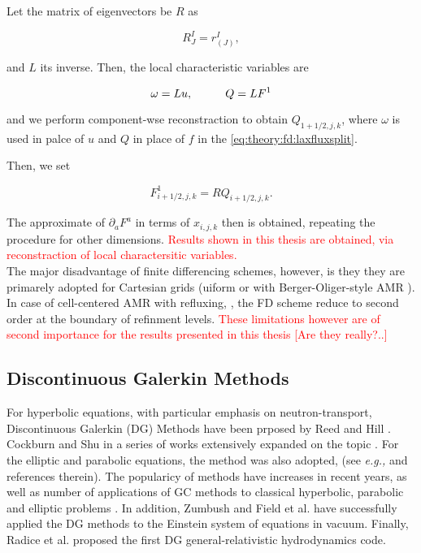 \documentclass[11pt,a4paper,headinclude=true,DIV=14,BCOR=8mm,chapterprefix,listof=totoc,twoside,openright,abstracton]{scrbook}
\begin{document}
Let the matrix of eigenvectors be $R$ as 

\begin{equation}
    R_{J}^{I} = r^{I}_{(J)},
\end{equation}

and $L$ its inverse. Then, the local characteristic variables are 

\begin{equation}
    \omega = Lu, \hspace{10mm} Q = LF^1
\end{equation}

and we perform component-wse reconstraction to obtain $Q_{1+1/2,j,k}$, where $\omega$ is used in palce of $u$ and $Q$ in place of $f$ in the \ref{eq:theory:fd:laxfluxsplit}. 

Then, we set

\begin{equation}
    F^1_{i+1/2, j, k} = RQ_{i+1/2, j, k}.
\end{equation}

The approximate of $\partial_a F^a$ in terms of $x_{i,j,k}$ then is obtained, repeating the procedure for other dimensions. \textcolor{red}{Results shown in this thesis are obtained, via reconstraction of local charactersitic variables.} \\

The major disadvantage of finite differencing schemes, however, is they they are primarely adopted for Cartesian grids (uiform or with Berger-Oliger-style AMR \cite{Berger:1984}). In case of cell-centered AMR with refluxing, \cite{Berger:1989}, the FD scheme reduce to second order at the boundary of refinment levels. \textcolor{red}{These limitations however are of second importance for the results presented in this thesis [Are they really?..]}

\subsection{Discontinuous Galerkin Methods}

For hyperbolic equations, with particular emphasis on neutron-transport, Discontinuous Galerkin (DG) Methods have been prposed by Reed and Hill \cite{Reed:1973}. Cockburn and Shu in a series of works extensively expanded on the topic \cite{Cockburn:1991,Cockburn:1989ii,Cockburn:1989iii,Cockburn:1990iv,Cockburn:1998v}. For the elliptic and parabolic equations, the method was also adopted, (see \textit{e.g.,} \cite{Arnold:2002} and references therein). The popularicy of methods have increases in recent years, as well as number of applications of GC methods to classical hyperbolic, parabolic and elliptic problems \cite{Cockburn:2000,Canuto:2008,Hesthaven:2007}. In addition, Zumbush \cite{Zumbusch:2009fe} and Field et al. \cite{Field:2010} have successfully applied the DG methods to the Einstein system of equations in vacuum. Finally, Radice et al. \cite{Radice:2011qr} proposed the first DG general-relativistic hydrodynamics code. \\
\end{document}
